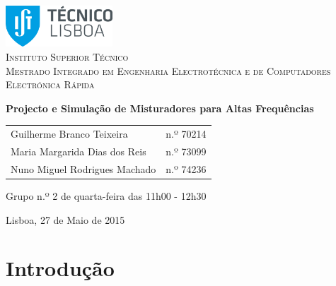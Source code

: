 \documentclass[11pt]{article}
\numberwithin{equation}{section}
\begin{document}
	
\begin{titlepage}
\begin{center}
	
\hfill \break
\hfill \break

\includegraphics[width=0.3\textwidth]{./logo}~\\[1cm] 

\textsc{\LARGE Instituto Superior Técnico}\\[0.25cm]
\textsc{\Large Mestrado Integrado em Engenharia Electrotécnica e de Computadores}\\[1.8cm]
\textsc{\huge Electrónica Rápida}\\[0.25cm]

\vspace{6mm}

{\huge \bfseries Projecto e Simulação de Misturadores para Altas Frequências\\[1cm]}

\begin{tabular}{ l l }
	Guilherme Branco Teixeira & \hspace{2mm} n.º 70214 \\
	Maria Margarida Dias dos Reis & \hspace{2mm} n.º 73099 \\
	Nuno Miguel Rodrigues Machado & \hspace{2mm} n.º 74236
\end{tabular}

\vspace{7mm}

Grupo n.º 2 de quarta-feira das 11h00 - 12h30

\vfill

{\large Lisboa, 27 de Maio de 2015}
	
\end{center}
\end{titlepage}

\clearpage

\tableofcontents
\pagebreak

\clearpage
{}

\section{Introdução}
\end{document}
